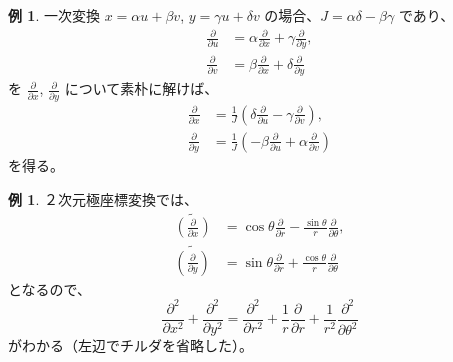 \documentclass[a4paper]{jsarticle}
\theoremstyle{definition}
\newtheorem{Example}[Theorem]{例}
\theoremstyle{remark}
\newcommand{\del}{\partial}
\begin{document}
\begin{Example}
  一次変換 $x = \alpha u + \beta v$, $y = \gamma u + \delta v$ の場合、$J = \alpha \delta - \beta\gamma$ であり、
  \begin{align*}
    \frac{\partial}{\partial u} & = \alpha \frac{\partial}{\partial x} + \gamma \frac{\partial}{\partial y},\\
     \frac{\partial}{\partial v} & = \beta \frac{\partial}{\partial x} + \delta \frac{\partial}{\partial y}
  \end{align*}
 を $\frac{\partial}{\partial x}$, $\frac{\partial}{\partial y}$ について素朴に解けば、
 \begin{align*}
    \frac{\partial}{\partial x} & = \frac{1}{J} \left( \delta \frac{\partial}{\partial u} - \gamma \frac{\partial}{\partial v}\right),\\
     \frac{\partial}{\partial y} & = \frac{1}{J} \left( -\beta \frac{\partial}{\partial u} + \alpha \frac{\partial}{\partial v}\right)
  \end{align*}
 を得る。
% 
\end{Example}

\begin{Example}
２次元極座標変換では、
\begin{align*}
\widetilde{\left(\frac{\del}{\del x}\right)} 
&= \cos\theta \frac{\del}{\del r} - \frac{\sin\theta}{r} 
\frac{\del}{\del \theta},\\
\widetilde{\left(\frac{\del}{\del y}\right)} 
&= \sin\theta \frac{\del}{\del r} + 
\frac{\cos\theta}{r} \frac{\del}{\del \theta}
\end{align*}
となるので、
\[
\frac{\del^2}{\del x^2} + \frac{\del^2}{\del y^2} 
= \frac{\del^2}{\del r^2} + \frac{1}{r} \frac{\del}{\del r} + 
\frac{1}{r^2} \frac{\del^2}{\del \theta^2} 
\]
がわかる（左辺でチルダを省略した）。
\end{Example}
\end{document}
